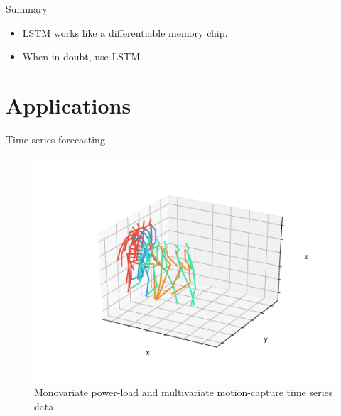 \documentclass{beamer}
\begin{document}
    \begin{frame}{Summary}
      \begin{itemize}
        \item LSTM works like a differentiable memory chip.
        \item When in doubt, use LSTM.
      \end{itemize}
    \end{frame}

    \section{Applications}

    \begin{frame}{Time-series forecasting}
      \begin{figure}
          
          \includegraphics[width=0.5\linewidth]{./figures/test_figure17.pdf}
          \caption{Monovariate power-load and multivariate motion-capture time series data.}
      \end{figure}
    \end{frame}
\end{document}
